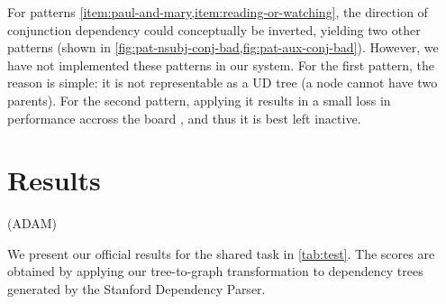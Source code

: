 \documentclass[11pt,a4paper]{article}
\begin{document}


For patterns \cref{item:paul-and-mary,item:reading-or-watching}, the
direction of conjunction dependency could conceptually be inverted, yielding two
other patterns (shown in
\cref{fig:pat-nsubj-conj-bad,fig:pat-aux-conj-bad}). However, we have
not implemented these patterns in our system. For the first pattern,
the reason is simple: it is not representable as a UD tree (a node
cannot have two parents). For the second pattern, applying it
results in a small loss in performance accross the board , and thus it is best left inactive.

\section{Results}
(ADAM)

We present our official results for the shared task in
\cref{tab:test}. The scores are obtained by applying our tree-to-graph
transformation to dependency trees generated by the Stanford
Dependency Parser.
\end{document}
